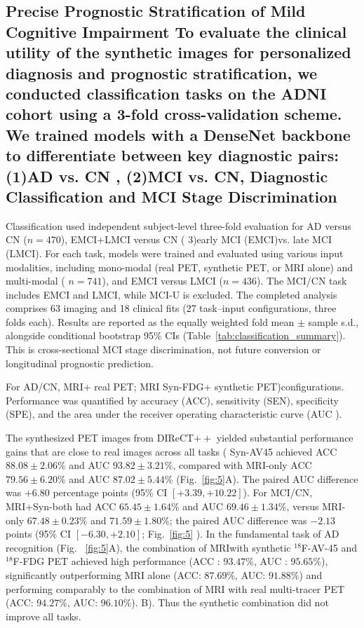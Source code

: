 \documentclass{article}
\providecommand{\DIFaddtex}[1]{{\protect\color{blue} \sf #1}} %
\providecommand{\DIFdeltex}[1]{{\protect\color{red} \scriptsize #1}} %
\providecommand{\DIFaddbegin}{} %
\providecommand{\DIFaddend}{} %
\providecommand{\DIFdelbegin}{} %
\providecommand{\DIFdelend}{} %
\providecommand{\DIFadd}[1]{\texorpdfstring{\DIFaddtex{#1}}{#1}} %
\providecommand{\DIFdel}[1]{\texorpdfstring{\DIFdeltex{#1}}{}} %
\newcommand{\DIFscaledelfig}{0.5}
\newlength{\DIFdelgraphicswidth} %
\newlength{\DIFdelgraphicsheight} %
\newcommand{\DIFaddincludegraphics}[2][]{{\color{blue}\fbox{\DIFOincludegraphics[#1]{#2}}}} %
\newcommand{\DIFdelincludegraphics}[2][]{%
\sbox{\DIFdelgraphicsbox}{\DIFOincludegraphics[#1]{#2}}%
\settoboxwidth{\DIFdelgraphicswidth}{\DIFdelgraphicsbox} %
\settoboxtotalheight{\DIFdelgraphicsheight}{\DIFdelgraphicsbox} %
\scalebox{\DIFscaledelfig}{%
\parbox[b]{\DIFdelgraphicswidth}{\usebox{\DIFdelgraphicsbox}\\[-\baselineskip] \rule{\DIFdelgraphicswidth}{0em}}\llap{\resizebox{\DIFdelgraphicswidth}{\DIFdelgraphicsheight}{%
\setlength{\unitlength}{\DIFdelgraphicswidth}%
\begin{picture}(1,1)%
\thicklines\linethickness{2pt} %
{\color[rgb]{1,0,0}\put(0,0){\framebox(1,1){}}}%
{\color[rgb]{1,0,0}\put(0,0){\line( 1,1){1}}}%
{\color[rgb]{1,0,0}\put(0,1){\line(1,-1){1}}}%
\end{picture}%
}\hspace*{3pt}}} %
} %
\DeclareRobustCommand{\DIFaddbegin}{\DIFOaddbegin \let\includegraphics\DIFaddincludegraphics} %
\DeclareRobustCommand{\DIFaddend}{\DIFOaddend \let\includegraphics\DIFOincludegraphics} %
\DeclareRobustCommand{\DIFdelbegin}{\DIFOdelbegin \let\includegraphics\DIFdelincludegraphics} %
\DeclareRobustCommand{\DIFdelend}{\DIFOaddend \let\includegraphics\DIFOincludegraphics} %
\begin{document}
\subsection{\DIFdelbegin \DIFdel{Precise Prognostic Stratification of Mild Cognitive Impairment}%
\DIFdel{To evaluate the clinical utility of the synthetic images for personalized diagnosis and prognostic stratification, we conducted classification tasks on the ADNI cohort using a 3-fold cross-validation scheme. We trained models with a DenseNet backbone~\cite{huang2017densely} to differentiate between key diagnostic pairs: (1)AD vs. CN , (2)MCI vs. CN, }\DIFdelend \DIFaddbegin \DIFadd{Diagnostic Classification }\DIFaddend and \DIFaddbegin \DIFadd{MCI Stage Discrimination}}
\DIFadd{Classification used independent subject-level three-fold evaluation for AD versus CN ($n=470$), EMCI+LMCI versus CN }\DIFaddend (\DIFdelbegin \DIFdel{3)early MCI (EMCI)vs. late MCI (LMCI).
For each task, models were trained and evaluated using various input modalities, including mono-modal (real PET, synthetic PET, or MRI alone) and multi-modal (}\DIFdelend \DIFaddbegin \DIFadd{$n=741$), and EMCI versus LMCI ($n=436$). The MCI/CN task includes EMCI and LMCI, while MCI-U is excluded. The completed analysis comprises 63 imaging and 18 clinical fits (27 task--input configurations, three folds each). Results are reported as the equally weighted fold mean $\pm$ sample s.d., alongside conditional bootstrap 95\% CIs (Table~\ref{tab:classification_summary}). This is cross-sectional MCI stage discrimination, not future conversion or longitudinal prognostic prediction.
}

\DIFadd{For AD/CN, }\DIFaddend MRI+\DIFdelbegin \DIFdel{real PET; MRI }\DIFdelend \DIFaddbegin \DIFadd{Syn-FDG}\DIFaddend +\DIFdelbegin \DIFdel{synthetic PET)configurations. Performance was quantified by accuracy (ACC), sensitivity (SEN), specificity (SPE), and the area under the receiver operating characteristic curve (AUC ).
}%

\DIFdel{The synthesized PET images from DIReCT$++$ yielded substantial performance gains that are close to real images across all tasks (}\DIFdelend \DIFaddbegin \DIFadd{Syn-AV45 achieved ACC $88.08\pm2.06\%$ and AUC $93.82\pm3.21\%$, compared with MRI-only ACC $79.56\pm6.20\%$ and AUC $87.02\pm5.44\%$ (Fig.~\ref{fig:5}A). The paired AUC difference was $+6.80$ percentage points (95\% CI $[+3.39,+10.22]$). For MCI/CN, MRI+Syn-both had ACC $65.45\pm1.64\%$ and AUC $69.46\pm1.34\%$, versus MRI-only $67.48\pm0.23\%$ and $71.59\pm1.80\%$; the paired AUC difference was $-2.13$ points (95\% CI $[-6.30,+2.10]$; }\DIFaddend Fig.~\ref{fig:5}\DIFdelbegin \DIFdel{). In the fundamental task of AD recognition (Fig.
~\ref{fig:5}A), the combination of MRIwith synthetic $^{18}$F-AV-45 and $^{18}$F-FDG PET achieved high performance (ACC : $93.47\%$, AUC : $95.65\%$), significantly outperforming MRI alone (ACC: $87.69\%$, AUC: $91.88\%$) and performing comparably to the combination of MRI with real multi-tracer PET (ACC: $94.27\%$, AUC: $96.10\%$).
}\DIFdelend \DIFaddbegin \DIFadd{B). Thus the synthetic combination did not improve all tasks.
}\DIFaddend 
\end{document}
